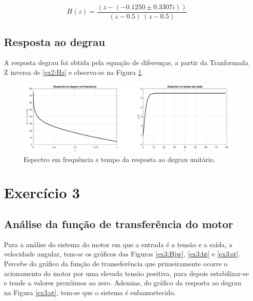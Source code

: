 \documentclass[a4paper,12pt,oneside,openany,table,xcdraw]{article}
\begin{document}
\begin{equation} \label{ex2:pz}
H(z) = \dfrac{(z-(-0.1250 \pm 0.3307i))}{(z-0.5)\ (z-0.5)}
\end{equation}
 
\vspace{0.3cm}
\subsection{Resposta ao degrau}
A resposta degrau foi obtida pela equação de diferenças, a partir da Tranformada Z inversa de \ref{ex2:Hz} e observa-se na Figura \ref{ex2:u}.

\vspace{0.2cm}
\begin{figure}[H]
\centering
\includegraphics[width=15.5cm]{ex2-u}
\caption{Espectro em frequência e tempo da resposta ao degrau unitário.}
\label{ex2:u}
\end{figure}

\vspace{0.3cm}
\section{Exercício 3}
\subsection{Análise da função de transferência do motor}
Para a análise do sistema do motor em que a entrada é a tensão e a saída, a velocidade angular, tem-se os gráficos das Figuras \ref{ex3:Hjw}, \ref{ex3:ht} e \ref{ex3:st}. Percebe do gráfico da função de transeferência que primeiramente ocorre o acionamento do motor por uma elevada tensão positiva, para depois estabilizar-se e tende a valores proxóimos ao zero. Ademias, do gráfico da resposta ao degrau na Figura \ref{ex3:st}, tem-se que o sistema é subamortecido.
\end{document}
